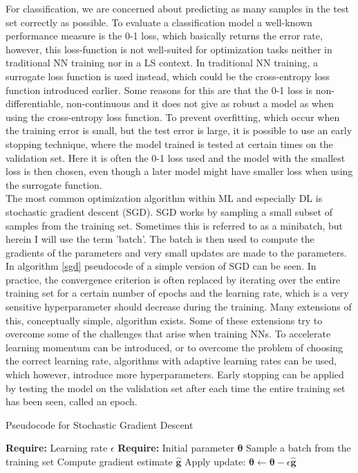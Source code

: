 \noindent For classification, we are concerned about predicting as many samples in the test set correctly as possible. To evaluate a classification model a well-known performance measure is the 0-1 loss, which basically returns the error rate, however, this loss-function is not well-suited for optimization tasks neither in traditional NN training nor in a LS context. In traditional NN training, a surrogate loss function is used instead, which could be the cross-entropy loss function introduced earlier. Some reasons for this are that the 0-1 loss is non-differentiable, non-continuous and it does not give as robust a model as when using the cross-entropy loss function. To prevent overfitting, which occur when the training error is small, but the test error is large, it is possible to use an early stopping technique, where the model trained is tested at certain times on the validation set. Here it is often the 0-1 loss used and the model with the smallest loss is then chosen, even though a later model might have smaller loss when using the surrogate function. \\ 

\noindent The most common optimization algorithm within ML and especially DL is stochastic gradient descent (SGD). SGD works by sampling a small subset of samples from the training set. Sometimes this is referred to as a minibatch, but herein I will use the term 'batch'. The batch is then used to compute the gradients of the parameters and very small updates are made to the parameters. In algorithm \ref{sgd} pseudocode of a simple version of SGD can be seen. In practice, the convergence criterion is often replaced by iterating over the entire training set for a certain number of epochs and the learning rate, which is a very sensitive hyperparameter should decrease during the training. Many extensions of this, conceptually simple, algorithm exists. Some of these extensions try to overcome some of the challenges that arise when training NNs. To accelerate learning momentum can be introduced, or to overcome the problem of choosing the correct learning rate, algorithms with adaptive learning rates can be used, which however, introduce more hyperparameters. Early stopping can be applied by testing the model on the validation set after each time the entire training set has been seen, called an epoch. 

\begin{algorithm}
\caption{Pseudocode for Stochastic Gradient Descent} \label{sgd}
\begin{algorithmic}
    \State \textbf{Require:} Learning rate $\epsilon$ 
    \State \textbf{Require:} Initial parameter $\boldsymbol{\theta}$
        \State Sample a batch from the training set 
        \State Compute gradient estimate $\boldsymbol{\hat{g}}$
        \State Apply update: $\boldsymbol{\theta} \leftarrow \boldsymbol{\theta -} \epsilon \boldsymbol{\hat{g}}$
    \EndWhile
\end{algorithmic}
\end{algorithm}

